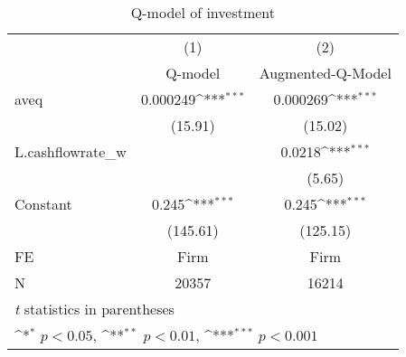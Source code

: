 \begin{table}[htbp]\centering
\def\sym#1{\ifmmode^{#1}\else\(^{#1}\)\fi}
\caption{Q-model of investment}
\begin{tabular}{l*{2}{c}}
\toprule
                    &\multicolumn{1}{c}{(1)}&\multicolumn{1}{c}{(2)}\\
                    &\multicolumn{1}{c}{Q-model}&\multicolumn{1}{c}{Augmented-Q-Model}\\
\midrule
aveq                &    0.000249\sym{***}&    0.000269\sym{***}\\
                    &     (15.91)         &     (15.02)         \\
\addlinespace
L.cashflowrate\_w    &                     &      0.0218\sym{***}\\
                    &                     &      (5.65)         \\
\addlinespace
Constant            &       0.245\sym{***}&       0.245\sym{***}\\
                    &    (145.61)         &    (125.15)         \\
\midrule
FE                  &        Firm         &        Firm         \\
N                   &       20357         &       16214         \\
\bottomrule
\multicolumn{3}{l}{\footnotesize \textit{t} statistics in parentheses}\\
\multicolumn{3}{l}{\footnotesize \sym{*} \(p<0.05\), \sym{**} \(p<0.01\), \sym{***} \(p<0.001\)}\\
\end{tabular}
\end{table}
